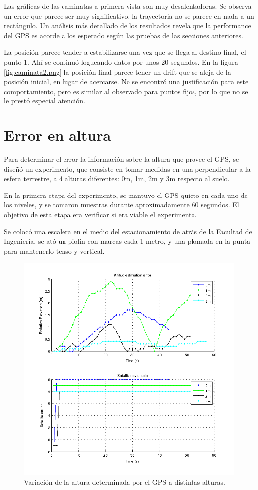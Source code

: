 \documentclass[spanish,12pt,a4paper,titlepage]{report}
\begin{document}
Las gráficas de las caminatas a primera vista son muy desalentadoras. Se observa un error que parece ser muy significativo, la trayectoria no se parece en nada a un rectángulo. Un análisis más detallado de los resultados revela que la performance del GPS es acorde a los esperado según las pruebas de las secciones anteriores.

La posición parece tender a estabilizarse una vez que se llega al destino final, el punto 1. Ahí se continuó logueando datos por unos 20 segundos. En la figura \ref{fig:caminata2.png} la posición final parece tener un drift que se aleja de la posición inicial, en lugar de acercarse. No se encontró una justificación para este comportamiento, pero es similar al observado para puntos fijos, por lo que no se le prestó especial atención.

\newpage
\section{Error en altura}
\label{sec:error-en-altura}

Para determinar el error la información sobre la altura que provee el GPS, se diseñó un experimento, que consiste en tomar medidas en una perpendicular a la esfera terrestre, a 4 alturas diferentes: 0m, 1m, 2m y 3m respecto al suelo.

En la primera etapa del experimento, se mantuvo el GPS quieto en cada uno de los niveles, y se tomaron muestras durante aproximadamente 60 segundos. El objetivo de esta etapa era verificar si era viable el experimento.

Se colocó una escalera en el medio del estacionamiento de atrás de la Facultad de Ingeniería, se ató un piolín con marcas cada 1 metro, y una plomada en la punta para mantenerlo tenso y vertical.

\begin{figure}[h!]
  \begin{center}
  \includegraphics[width=.7\textwidth]{./img/altura_punto_fijo_fing.png}
  \end{center}
  \caption{Variación de la altura determinada por el GPS a distintas alturas.}
  \label{fig:altura_punto_fijo_fing.png}
\end{figure}
\end{document}
